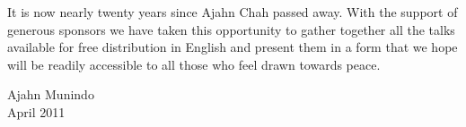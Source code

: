 It is now nearly twenty years since Ajahn Chah passed away. With the support of generous sponsors we have taken this opportunity to gather together all the talks available for free distribution in English and present them in a form that we hope will be readily accessible to all those who feel drawn towards peace.
\vspace*{2\baselineskip}

{\raggedleft\par Ajahn Munindo\\
April 2011 \par}


